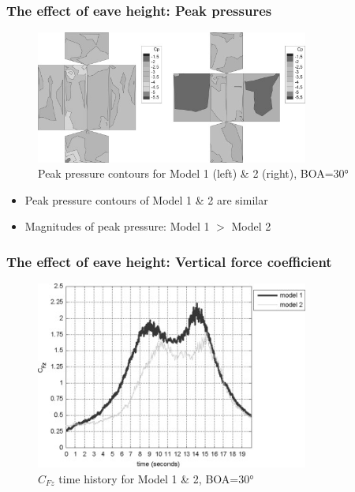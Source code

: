 \documentclass[handout]{beamer}
\begin{document}
\begin{frame}
	\frametitle{The effect of eave height: Peak pressures}
	\begin{figure}
		\centering
		\includegraphics[width=0.8\textwidth]{./fig/4.jpg}
		\caption{Peak pressure contours for Model 1 (left) \& 2 (right), BOA=\ang{30}}
	\end{figure}
	\begin{itemize}
		\item Peak pressure contours of Model 1 \& 2 are similar
		\item Magnitudes of peak pressure: Model 1 $>$ Model 2
	\end{itemize}
\end{frame}

\begin{frame}
	\frametitle{The effect of eave height: Vertical force coefficient}
	\begin{figure}
		\includegraphics[width=0.8\textwidth]{./fig/5.jpg}
		\caption{$C_{Fz}$ time history for Model 1 \& 2, BOA=\ang{30}}
	\end{figure}
\end{frame}
\end{document}
